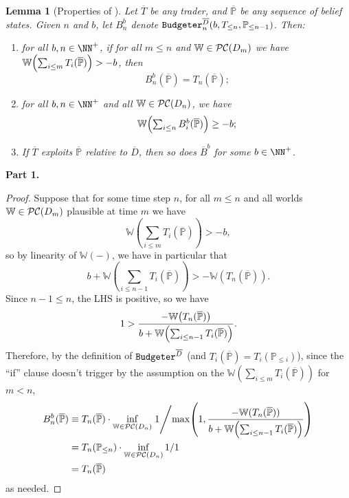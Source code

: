 \documentclass[authordate,onecolumn,noenvironments]{miri-tech-article}
\numberwithin{equation}{subsection}
\newtheorem{lemma}[theorem]{Lemma}
\newcommand{\seq}[1]{{\overline{#1}}}
\newcommand{\any}{-}
\newcommand{\mm}{m}
\newcommand{\nn}{n}
\newcommand{\tinysection}[1]{\medskip\noindent\textbf{#1.}}
\newcommand{\trade}{T}%
\newcommand{\Trader}{\seq{\trade}} %
\newcommand{\budgeter}{\text{\upshape{\texttt{Budgeter}}}\xspace}
\newcommand{\BelState}{\mathbb{P}}
\newcommand{\pt}{\BelState}
\newcommand{\MP}{\seq{\pt}}
\newcommand{\dt}{D}
\newcommand{\DP}{\seq{\dt}}
\newcommand{\pcworlds}{\mathcal{P\-C}}
\newcommand{\World}{\mathbb{W}}
\begin{document}
\begin{lemma}[Properties of \budgeter]\label{lem:budgeter}
  Let $\Trader$ be any trader, and $\MP$ be any sequence of belief states. Given $\nn$ and $b$, let $B^b_\nn$ denote $\budgeter^\DP_\nn(b,\trade_{\leq \nn},\pt_{\le \nn-1})$. Then:
  \begin{enumerate}
    \item for all $b,\nn\in\NN^+$, if for all $\mm \le \nn$ and $\World \in \pcworlds(\dt_\mm)$ we have $\World\mleft(\sum_{i\leq m}\trade_i(\MP)\mright)>-b$, then
      \[
        B_\nn^b(\MP)=\trade_\nn(\MP)\text{;}
      \]
    \item for all $b,n\in\NN^+$ and all $\World\in\pcworlds(\dt_\nn)$, we have
      \[
        \World\mleft(\textstyle\sum_{i\leq n}B_i^b(\MP)\mright)\geq -b\text{;}
      \]
    \item If $\seq \trade$ exploits $\MP$ relative to $\DP$, then so does $\seq {B}^b$ for some $b\in\NN^+$.
  \end{enumerate}
\end{lemma}

\tinysection{Part 1}

\begin{proof}
  Suppose that for some time step $n$, for all $m\leq n$ and all worlds $\World\in\pcworlds(\dt_\mm)$ plausible at time $m$ we have
  \[
    \World\left({\textstyle \sum_{i \leq \mm}
    \trade_{i}(\MP)} \right)> -b,
  \]
  so by linearity of $\World(\any)$, we have in particular that
  \[
    b+ \World\left({\textstyle \sum_{i \leq \nn-1 }
    \trade_{i}(\MP)} \right)
    > -\World\left({\textstyle 
    \trade_{\nn}(\MP)} \right).
  \]
  Since $\nn-1\le \nn$, the LHS is positive, so we have
  \[
    1> \frac{-\World\mleft({\textstyle \trade_{\nn}(\MP)}\mright)}
            {b+ \World\mleft({\textstyle \sum_{i \leq \nn-1} \trade_{i}(\MP)}\mright)}.
  \]
  Therefore, by the definition of $\budgeter^\DP$ (and $\trade_i(\MP) = \trade_i(\pt_{\le i})$), since the ``if'' clause doesn't trigger by the assumption on the $ \World\left({\textstyle \sum_{i \leq \mm}
    \trade_{i}(\MP)} \right)$ for $m<n$,
  \begin{align*}
    B_\nn^b(\MP) &\equiv
      \trade_\nn(\MP)
      \cdot
      \inf_{\World\in\pcworlds(\dt_\nn)}
      \left.
      1 \middle/ \max\mleft(1,
        \frac{-\World(\trade_\nn(\MP))}
             {b+\World\mleft({\textstyle \sum_{i \leq \nn-1} \trade_{i}(\MP)}\mright)}
      \mright)
      \right.\\
    &= \trade_\nn(\pt_{\leq \nn}) \cdot \inf_{\World\in\pcworlds(\dt_\nn)} 1/1 \\
    &= \trade_\nn(\MP)
  \end{align*}
  as needed.
\end{proof}
\end{document}
